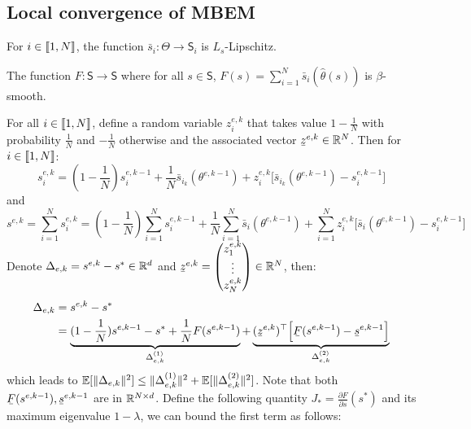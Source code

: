 \subsection{Local convergence of MBEM}
\begin{assumption}
For $i \in \llbracket1,N\rrbracket$,  the function $\bar{s}_i: \Theta \to \mathsf{S}_i$ is $L_s$-Lipschitz.
\end{assumption}

\begin{assumption}
The function $F: \mathsf{S} \to \mathsf{S}$ where for all $s \in  \mathsf{S}$, $F(s) = \sum_{i=1}^N \bar{s}_i (\hat{\theta}(s))$ is $\beta$-smooth.
\end{assumption}
For all $i \in \llbracket1,N\rrbracket$, define a random variable $z_i^{e,k}$ that takes value $1-\frac{1}{N}$ with probability $\frac{1}{N}$ and $-\frac{1}{N}$ otherwise and the associated vector $\barbelow{z}^{e,k} \in \rset^N$. Then for $i \in \llbracket1,N\rrbracket$:
\begin{equation}
s_i^{e,k} = (1-\frac{1}{N}) s_i^{e,k-1} + \frac{1}{N}\bar{s}_{i_k}(\theta^{e,k-1}) + z_i^{e,k} \Big[\bar{s}_{i_k}(\theta^{e,k-1}) - s_i^{e,k-1}\Big]
\end{equation}
and
\begin{equation}
s^{e,k} =  \sum_{i=1}^N s_i^{e,k} = (1-\frac{1}{N})  \sum_{i=1}^N s_i^{e,k-1} + \frac{1}{N}  \sum_{i=1}^N \bar{s}_i(\theta^{e,k-1}) +  \sum_{i=1}^N z_i^{e,k} \Big[\bar{s}_i(\theta^{e,k-1}) - s_i^{e,k-1}\Big]
\end{equation}
Denote $\Delta_{e,k} = s^{e,k} - s^* \in \mathbb{R}^{d}$ and  $\barbelow{z}^{e,k} = \begin{pmatrix} 
z_1^{e,k}  \\
\vdots  \\
z_N^{e,k}
\end{pmatrix} \in \rset^{N}$, then:
\begin{equation}
\begin{split}
\Delta_{e,k} & = s^{e,k} - s^* \\
& = \underbrace{(1-\frac{1}{N}) s^{e,k-1} - s^*  +  \frac{1}{N}  F(s^{e,k-1})}_{\Delta_{e,k}^{(1)}}  + \underbrace{(\barbelow{z}^{e,k})^\top \Big[ \barbelow{F}(s^{e,k-1}) - \barbelow{s}^{e,k-1} \Big]}_{\Delta_{e,k}^{(2)}}
\end{split}
\end{equation}
which leads to $\operatorname*{\mathbb{E}}[\lVert\Delta_{e,k}\rVert^2] \leq \lVert\Delta_{e,k}^{(1)}\rVert^2 + \operatorname*{\mathbb{E}}[\lVert\Delta_{e,k}^{(2)}\rVert^2] $. Note that both $\barbelow{F}(s^{e,k-1}), \barbelow{s}^{e,k-1}$ are in $\mathbb{R}^{N \times d}$.
Define the following quantity $J_* = \frac{\partial F}{\partial s}(s^*)$ and its maximum eigenvalue $1-\lambda$, we can bound the first term as follows:
